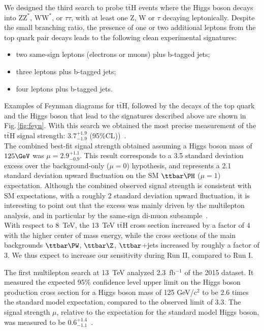 We designed the third search to probe $\mathrm{t \bar t
H}$ events where the Higgs boson decays into $\mathrm{ZZ}^{*}$,
$\mathrm{WW}^{*}$, or $\tau\tau$, with at least one Z, W or $\tau$
decaying leptonically. Despite
the small branching ratio, the presence of one
or two additional leptons from the top quark pair decays leads to the
following clean experimental signatures:
%
\begin{itemize}
\item two same-sign leptons
(electrons or muons) plus b-tagged jets;
\item three leptons plus b-tagged jets;
\item four leptons plus b-tagged jets.
\end{itemize}
Examples of Feynman diagrams for $\mathrm{t \bar t H}$,
followed by the decays of the top quark and the Higgs boson that lead to the signatures
described above are shown  in Fig.\,\ref{fig:feyn}.
With this search we obtained the most precise measurement of the $\mathrm{t \bar t
H}$ signal strength: $3.7^{+1.9}_{-1.9}$
(95\%CL))~\cite{cms_multilepton}.\\

The combined best-fit signal strength
obtained assuming a Higgs boson mass of $125 \GeV$ was $\mu =
2.9^{+1.1}_{-0.9}$.  This result corresponds to a 3.5 standard
deviation excess over the background-only ($\mu = 0$) hypothesis, and
represents a 2.1 standard deviation upward fluctuation on the SM
$\ttbar \PH$ ($\mu = 1$) expectation. Although the combined observed signal strength is consistent with SM
expectations, with a roughly 2 standard deviation upward
fluctuation, it is interesting to point out that the excess was mainly
driven by the multilepton analysis, and in particular by the same-sign
di-muon subsample~\cite{cms_multilepton}.\\


With respect to 8~TeV, the 13~TeV $\mathrm{t \bar t H}$ cross section increased by a factor of 4 
with the higher center of mass energy, while the cross sections of the main backgrounds
$\ttbar\PW$, $\ttbar\Z$, $\ttbar$+jets increased by roughly a factor of 3.
We thus expect to increase our sensitivity during Run II, compared to Run I.

The first multilepton search at 13~TeV analyzed 2.3~fb$^{-1}$ of the 2015 dataset.
It measured the expected 95\% confidence level upper limit on the Higgs boson production cross section for a Higgs boson mass of 125 GeV/c$^2$
to be $2.6$ times the standard model expectation, compared to the observed limit of $3.3$.
The signal strength $\mu$, relative to the expectation for the standard model
Higgs boson, was measured to be $0.6_{-1.1}^{+1.4}$~\cite{cms_multilepton_2015}.\\

